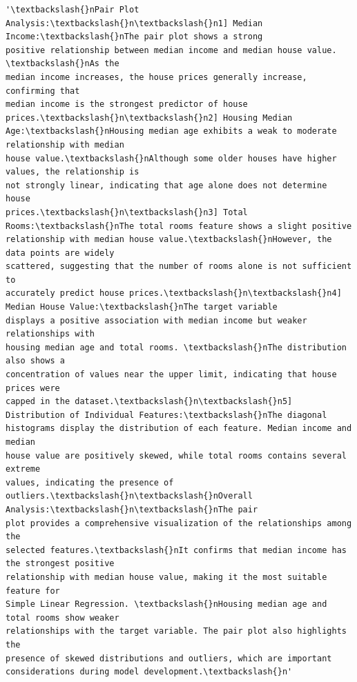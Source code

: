 \documentclass[11pt]{article}
\makeatletter
\newcommand{\boxspacing}{\kern\kvtcb@left@rule\kern\kvtcb@boxsep}
\newcommand{\prompt}[4]{
        {\ttfamily\llap{{\color{#2}[#3]:\hspace{3pt}#4}}\vspace{-\baselineskip}}
    }
\makeatother
\begin{document}
            \begin{tcolorbox}[breakable, size=fbox, boxrule=.5pt, pad at break*=1mm, opacityfill=0]
\prompt{Out}{outcolor}{71}{\boxspacing}
\begin{Verbatim}[commandchars=\\\{\}]
'\textbackslash{}nPair Plot Analysis:\textbackslash{}n\textbackslash{}n1] Median Income:\textbackslash{}nThe pair plot shows a strong
positive relationship between median income and median house value. \textbackslash{}nAs the
median income increases, the house prices generally increase, confirming that
median income is the strongest predictor of house prices.\textbackslash{}n\textbackslash{}n2] Housing Median
Age:\textbackslash{}nHousing median age exhibits a weak to moderate relationship with median
house value.\textbackslash{}nAlthough some older houses have higher values, the relationship is
not strongly linear, indicating that age alone does not determine house
prices.\textbackslash{}n\textbackslash{}n3] Total Rooms:\textbackslash{}nThe total rooms feature shows a slight positive
relationship with median house value.\textbackslash{}nHowever, the data points are widely
scattered, suggesting that the number of rooms alone is not sufficient to
accurately predict house prices.\textbackslash{}n\textbackslash{}n4] Median House Value:\textbackslash{}nThe target variable
displays a positive association with median income but weaker relationships with
housing median age and total rooms. \textbackslash{}nThe distribution also shows a
concentration of values near the upper limit, indicating that house prices were
capped in the dataset.\textbackslash{}n\textbackslash{}n5] Distribution of Individual Features:\textbackslash{}nThe diagonal
histograms display the distribution of each feature. Median income and median
house value are positively skewed, while total rooms contains several extreme
values, indicating the presence of outliers.\textbackslash{}n\textbackslash{}nOverall Analysis:\textbackslash{}n\textbackslash{}nThe pair
plot provides a comprehensive visualization of the relationships among the
selected features.\textbackslash{}nIt confirms that median income has the strongest positive
relationship with median house value, making it the most suitable feature for
Simple Linear Regression. \textbackslash{}nHousing median age and total rooms show weaker
relationships with the target variable. The pair plot also highlights the
presence of skewed distributions and outliers, which are important
considerations during model development.\textbackslash{}n'
\end{Verbatim}
\end{tcolorbox}
        
\end{document}
